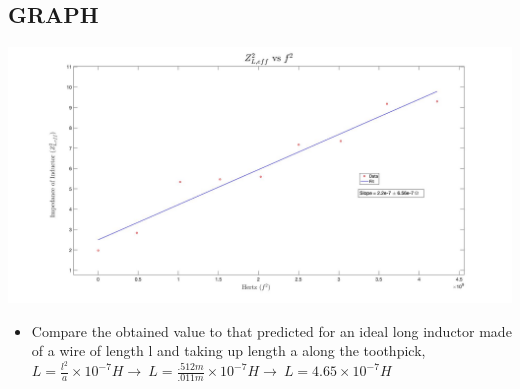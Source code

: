 \documentclass{article}
\def\F#1{\(#1\)}
\begin{document}
\begin{center}
  \subsection*{GRAPH}
  \includegraphics[width=\textwidth]{graph.jpg}
\end{center}
\begin{itemize}
  \item Compare the obtained value to that predicted for an ideal long inductor made of a wire of length l and taking up length a along the toothpick, \F{L=\frac{l^2}{a}\times{10}^{-7}H\rightarrow~L=\frac{.512 m}{.011 m}\times{10}^{-7}H\rightarrow~L=4.65\times{10}^{-7}H}
\end{itemize}
\end{document}
